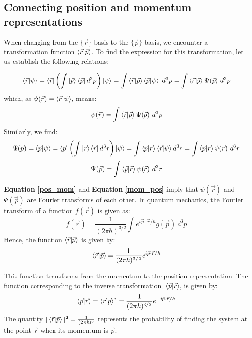 \subsection{Connecting position and momentum representations}

When changing from the $\{\vec{r}\}$ basis to the $\{\vec{p}\}$ basis, we encounter a transformation function $\braket{\vec{r}|\vec{p}}$. To find the expression for this transformation, let us establish the following relations:

\begin{equation}
    \braket{\vec{r}|\psi} = \bra{\vec{r}}\left(\int \ket{\vec{p}}\bra{\vec{p}}d^3p\right)\ket{\psi} = \int \braket{\vec{r}|\vec{p}}\braket{\vec{p}|\psi}\ d^3p = \int \braket{\vec{r}|\vec{p}}\Psi(\vec{p})\ d^3p
\end{equation}
which, as $\psi(\vec{r}) = \braket{\vec{r}|\psi}$, means:
\begin{equation} \label{pos_mom}
    \psi(\vec{r}) = \int \braket{\vec{r}|\vec{p}}\Psi(\vec{p})\ d^3p
\end{equation}
Similarly, we find:
\begin{equation}
    \Psi(\vec{p}) = \braket{\vec{p}|\psi} = \bra{\vec{p}}\left(\int \ket{\vec{r}}\bra{\vec{r}}d^3r\right)\ket{\psi} = \int \braket{\vec{p}|\vec{r}}\braket{\vec{r}|\psi} d^3r = \int \braket{\vec{p}|\vec{r}}\psi(\vec{r})\ d^3r
\end{equation}
\begin{equation} \label{mom_pos}
    \Psi(\vec{p}) = \int \braket{\vec{p}|\vec{r}}\psi(\vec{r})\ d^3r
\end{equation}

\textbf{Equation \ref{pos_mom}} and \textbf{Equation \ref{mom_pos}} imply that $\psi(\vec{r})$ and $\Psi(\vec{p})$ are Fourier transforms of each other. In quantum mechanics, the Fourier transform of a function $f(\vec{r})$ is given as:
\begin{equation}
    f(\vec{r}) = \frac{1}{(2\pi\hbar)^{3/2}}\int e^{i\vec{p}\cdot \vec{r}/\hbar} g(\vec{p})\ d^3p
\end{equation}
Hence, the function $\braket{\vec{r}|\vec{p}}$ is given by:
\begin{equation} \label{transform_1}
    \braket{\vec{r}|\vec{p}} = \frac{1}{(2\pi\hbar)^{3/2}}e^{i\vec{p}\cdot \vec{r}/\hbar}
\end{equation}

This function transforms from the momentum to the position representation. The function corresponding to the inverse transformation, $\braket{\vec{p}|\vec{r}}$, is given by:
\begin{equation}
    \braket{\vec{p}|\vec{r}} = \braket{\vec{r}|\vec{p}}^* = \frac{1}{(2\pi\hbar)^{3/2}}e^{-i\vec{p}\cdot \vec{r}/\hbar}
\end{equation}
The quantity $|\braket{\vec{r}|\vec{p}}|^2 = \frac{1}{(2\pi\hbar)^3}$ represents the probability of finding the system at the point $\vec{r}$ when its momentum is $\vec{p}$.

